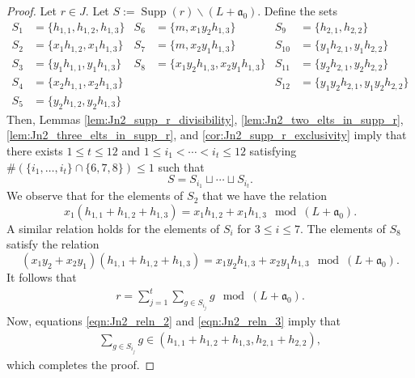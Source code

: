 \documentclass[12pt,a4paper]{amsart}
\theoremstyle{plain}
\theoremstyle{definition}
\def\bproof{\begin{proof}}
\def\eproof{\end{proof}}
\theoremstyle{remark}
\let\setminus=\smallsetminus
\def\a{\mathfrak{a}}
\DeclareMathOperator{\Supp}{Supp}
\begin{document}
\bproof
Let $r \in J$. Let $S := \Supp(r) \setminus (L+\a_{0})$. Define the sets
\begin{align*}
    S_{1} &= \{h_{1,1},h_{1,2},h_{1,3}\} & S_{6} &= \{ m,x_{1}y_{2}h_{1,3} \} & S_{9} &= \{ h_{2,1}, h_{2,2} \}  \\
    S_{2} &= \{x_{1} h_{1,2}, x_{1} h_{1,3}\} &  S_{7} &= \{ m,x_{2}y_{1}h_{1,3} \} & S_{10} &= \{ y_{1}h_{2,1}, y_{1}h_{2,2} \} \\
    S_{3} &= \{y_{1} h_{1,1}, y_{1} h_{1,3}\} &  S_{8} &= \{ x_{1}y_{2}h_{1,3}, x_{2}y_{1}h_{1,3} \} & S_{11} &= \{ y_{2}h_{2,1}, y_{2}h_{2,2} \} \\
    S_{4} &= \{x_{2} h_{1,1}, x_{2} h_{1,3}\} & & & S_{12} &= \{ y_{1}y_{2}h_{2,1}, y_{1}y_{2}h_{2,2} \} \\
    S_{5} &= \{y_{2} h_{1,2}, y_{2} h_{1,3}\} 
\end{align*}
Then, Lemmas \ref{lem:Jn2_supp_r_divisibility}, \ref{lem:Jn2_two_elts_in_supp_r}, \ref{lem:Jn2_three_elts_in_supp_r}, and \ref{cor:Jn2_supp_r_exclusivity} imply that there exists $1 \leq t \leq 12$ and $1 \leq i_{1} < \cdots < i_{t} \leq 12$ satisfying $\# \left( \{i_{1},\ldots,i_{t}\} \cap \{6,7,8\} \right) \leq 1$ such that 
\begin{equation}
    \label{eqn:Jn2_reln_1}
    S = S_{i_{1}} \sqcup \cdots \sqcup S_{i_{t}}.
\end{equation}
We observe that for the elements of $S_{2}$ that we have the relation 
\begin{equation}
    \label{eqn:Jn2_reln_2}
    x_{1} (h_{1,1} + h_{1,2} + h_{1,3}) = x_{1} h_{1,2} + x_{1} h_{1,3} \mod{(L + \a_{0})}.
\end{equation}
A similar relation holds for the elements of $S_{i}$ for $3 \leq i \leq 7$. The elements of $S_{8}$ satisfy the relation
\begin{equation}
    \label{eqn:Jn2_reln_3}
    (x_{1}y_{2} + x_{2}y_{1})(h_{1,1} + h_{1,2} + h_{1,3}) = x_{1}y_{2}h_{1,3} + x_{2}y_{1}h_{1,3} \mod{(L + \a_{0})}.
\end{equation}
It follows that
\begin{align*}
    r = \sum_{j = 1}^{t} \sum_{g\in S_{i_{j}}} g \mod{(L + \a_{0})}.
\end{align*}
Now, equations \eqref{eqn:Jn2_reln_2} and \eqref{eqn:Jn2_reln_3} imply that
\begin{align*}
    \sum_{g\in S_{i_{j}}} g \in (h_{1,1}+h_{1,2}+h_{1,3},h_{2,1} + h_{2,2}),
\end{align*}
which completes the proof.
\eproof
\end{document}
